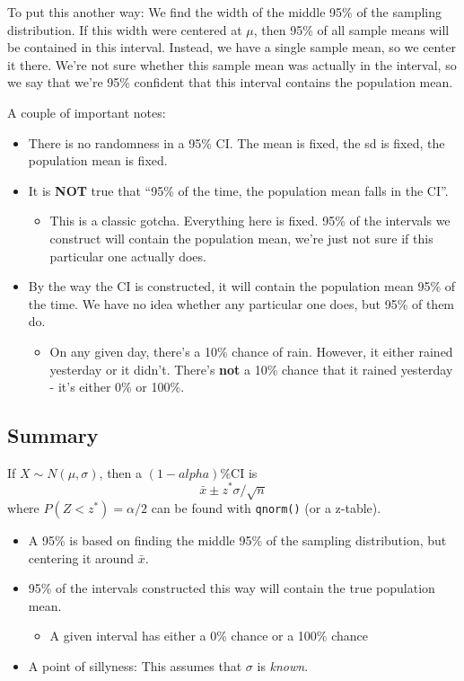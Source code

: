\documentclass[
  letterpaper,
  DIV=11,
  numbers=noendperiod,
  oneside]{scrreprt}
\providecommand{\tightlist}{%
  \setlength{\itemsep}{0pt}\setlength{\parskip}{0pt}}\usepackage{longtable,booktabs,array}
\begin{document}
To put this another way: We find the width of the middle 95\% of the
sampling distribution. If this width were centered at \(\mu\), then 95\%
of all sample means will be contained in this interval. Instead, we have
a single sample mean, so we center it there. We're not sure whether this
sample mean was actually in the interval, so we say that we're 95\%
confident that this interval contains the population mean.

A couple of important notes:

\begin{itemize}
\tightlist
\item
  There is no randomness in a 95\% CI. The mean is fixed, the sd is
  fixed, the population mean is fixed.
\item
  It is \textbf{NOT} true that ``95\% of the time, the population mean
  falls in the CI''.

  \begin{itemize}
  \tightlist
  \item
    This is a classic gotcha. Everything here is fixed. 95\% of the
    intervals we construct will contain the population mean, we're just
    not sure if this particular one actually does.
  \end{itemize}
\item
  By the way the CI is constructed, it will contain the population mean
  95\% of the time. We have no idea whether any particular one does, but
  95\% of them do.

  \begin{itemize}
  \tightlist
  \item
    On any given day, there's a 10\% chance of rain. However, it either
    rained yesterday or it didn't. There's \textbf{not} a 10\% chance
    that it rained yesterday - it's either 0\% or 100\%.
  \end{itemize}
\end{itemize}

\hypertarget{summary-4}{%
\subsection{Summary}\label{summary-4}}

If \(X\sim N(\mu,\sigma)\), then a \((1-alpha)\%\)CI is \[
\bar x \pm z^*\sigma/\sqrt{n}
\] where \(P(Z < z^*) = \alpha/2\) can be found with \texttt{qnorm()}
(or a z-table).

\begin{itemize}
\tightlist
\item
  A 95\% is based on finding the middle 95\% of the sampling
  distribution, but centering it around \(\bar x\).
\item
  95\% of the intervals constructed this way will contain the true
  population mean.

  \begin{itemize}
  \tightlist
  \item
    A given interval has either a 0\% chance or a 100\% chance
  \end{itemize}
\item
  A point of sillyness: This assumes that \(\sigma\) is \emph{known}.
\end{itemize}
\end{document}

